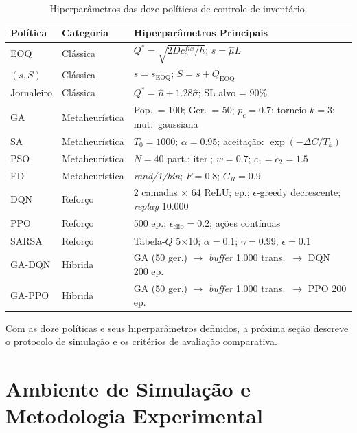 \documentclass[a4paper,11pt]{article}
\begin{document}
\begin{table}[ht]
\centering
\small
\caption{Hiperparâmetros das doze políticas de controle de
inventário.}
\label{tab:params}
\begin{tabular}{@{}llp{5.5cm}@{}}
\toprule
Política & Categoria & Hiperparâmetros Principais \\
\midrule
EOQ
  & Clássica
  & $Q^* = \sqrt{2Dc_o^{fix}/h}$;\; $s = \hat{\mu}L$ \\
$(s,S)$
  & Clássica
  & $s = s_\text{EOQ}$;\; $S = s + Q_\text{EOQ}$ \\
Jornaleiro
  & Clássica
  & $Q^* = \hat{\mu} + 1.28\hat{\sigma}$;\; SL alvo = $90\%$ \\
\midrule
GA
  & Metaheurística
  & Pop.\ = 100;\; Ger.\ = 50;\; $p_c = 0.7$;\; torneio $k=3$;\; mut.\ gaussiana \\
SA
  & Metaheurística
  & $T_0 = 1000$;\; $\alpha = 0.95$;\; aceitação: $\exp(-\Delta C/T_k)$ \\
PSO
  & Metaheurística
  & $N = 40$ part.;\; 80 iter.;\; $w = 0.7$;\; $c_1 = c_2 = 1.5$ \\
ED
  & Metaheurística
  & \textit{rand/1/bin};\; $F = 0.8$;\; $C_R = 0.9$ \\
\midrule
DQN
  & Reforço
  & 2 camadas $\times$ 64 ReLU;\; 500 ep.;\; $\epsilon$-greedy decrescente;\; \textit{replay} 10.000 \\
PPO
  & Reforço
  & 500 ep.;\; $\epsilon_\text{clip} = 0.2$;\; ações contínuas \\
SARSA
  & Reforço
  & Tabela-$Q$ 5$\times$10;\; $\alpha = 0.1$;\; $\gamma = 0.99$;\; $\epsilon = 0.1$ \\
\midrule
GA-DQN
  & Híbrida
  & GA (50 ger.) $\to$ \textit{buffer} 1.000 trans.\ $\to$ DQN 200 ep. \\
GA-PPO
  & Híbrida
  & GA (50 ger.) $\to$ \textit{buffer} 1.000 trans.\ $\to$ PPO 200 ep. \\
\bottomrule
\end{tabular}
\end{table}

Com as doze políticas e seus hiperparâmetros definidos, a próxima
seção descreve o protocolo de simulação e os critérios de avaliação
comparativa.

\section{Ambiente de Simulação e Metodologia Experimental}
\end{document}

